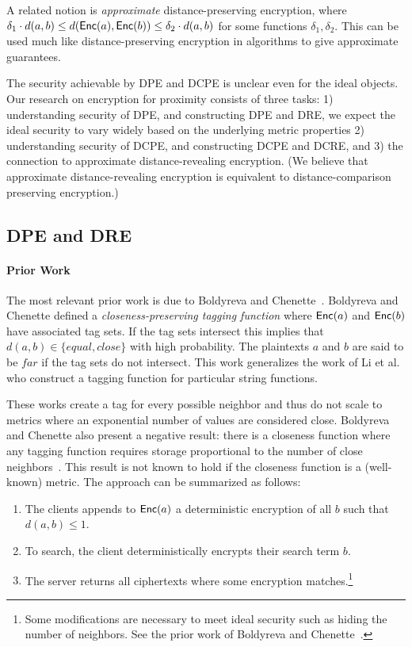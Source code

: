  A related notion is \emph{approximate} distance-preserving encryption, where  $\delta_1 \cdot d(a,b) \leq d(\mathsf{Enc}(a), \mathsf{Enc}(b)) \leq \delta_2  \cdot d(a,b)$ for some functions $\delta_1, \delta_2$.  This can be used much like distance-preserving encryption in algorithms to give approximate guarantees.

The security achievable by DPE and DCPE is unclear even for the ideal objects.
Our research on encryption for proximity  consists of three tasks: 1) understanding security of DPE, and constructing DPE and DRE, we expect the ideal security to vary widely based on the underlying metric properties 2) understanding security of DCPE, and constructing DCPE and DCRE,  and 3) the connection to approximate distance-revealing encryption. (We believe that approximate distance-revealing encryption is equivalent to distance-comparison preserving encryption.)

\subsection{DPE and DRE}

\paragraph{Prior Work}
The most relevant prior work is due to Boldyreva and Chenette~\cite{boldyreva2014efficient}.  Boldyreva and Chenette defined a \emph{closeness-preserving tagging function} where $\mathsf{Enc}(a)$ and $\mathsf{Enc}(b)$ have associated tag sets.  If the tag sets intersect this implies that $d(a,b) \in\{equal, close\}$ with high probability.  The plaintexts $a$ and $b$ are said to be $far$ if the tag sets do not intersect.  This work generalizes the work of Li et al.~\cite{li2010fuzzy,wang2013efficient} who construct a tagging function for particular string functions.  

These works create a tag for every possible neighbor and thus do not scale to metrics where an exponential number of values are considered close. Boldyreva and Chenette also present a negative result: there is a closeness function where any tagging function requires storage proportional to the number of close neighbors~\cite[Theorem 5.2]{boldyreva2014efficient}.  This result is not known to hold if the closeness function is a (well-known) metric.  
The approach can be summarized as follows:
\begin{enumerate}\setlength\itemsep{0em}
\item The clients appends to $\mathsf{Enc}(a)$ a deterministic encryption of all $b$ such that $d(a,b) \le 1$.
\item To search, the client deterministically encrypts their search term $b$.
\item The server returns all ciphertexts where some encryption matches.\footnote{Some  modifications are necessary to meet ideal security such as hiding the number of neighbors.  See the prior work of Boldyreva and Chenette~\cite{boldyreva2014efficient}.}  
\end{enumerate}

